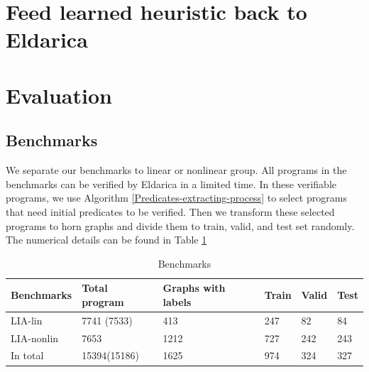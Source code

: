 \documentclass{article}
\begin{document}


\section{Feed learned heuristic back to Eldarica}

\section{Evaluation}
\subsection{Benchmarks}

We separate our benchmarks to linear or nonlinear group. All programs in the benchmarks can be verified by Eldarica in a limited time.
In these verifiable programs, we use Algorithm \ref{Predicates-extracting-process} to select programs that need initial predicates to be verified. Then we transform these selected programs to horn graphs and divide them to train, valid, and test set randomly. The numerical details can be found in Table \ref{benchmark-train-valid-test}

\begin{table}[h]\caption{Benchmarks}\label{benchmark-train-valid-test}
\begin{center}
\begin{tabular}{lp{2cm}p{3cm}p{2cm}p{2cm}p{2cm}}
\hline
Benchmarks  & Total program & Graphs with labels & Train & Valid & Test  \\
\hline
LIA-lin       & 7741 (7533)  & 413 & 247 & 82 & 84 \\
LIA-nonlin    & 7653         & 1212 & 727 & 242 & 243 \\
In total      & 15394(15186) & 1625 & 974 & 324 & 327\\
\hline
\end{tabular}
\end{center}
\end{table}
\end{document}
